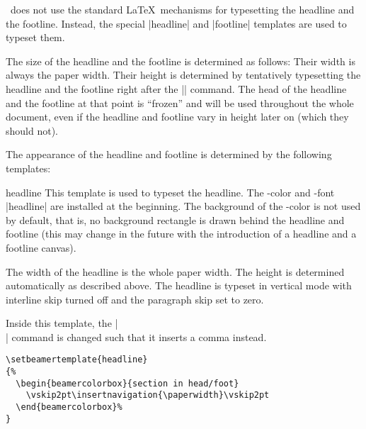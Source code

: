 \beamer\ does not use the standard \LaTeX\ mechanisms for typesetting the headline and the footline. Instead, the special |headline| and |footline| templates are used to typeset them.

The size of the headline and the footline is determined as follows: Their width is always the paper width. Their height is determined by tentatively typesetting the headline and the footline right after the || command. The head of the headline and the footline at that point is ``frozen'' and will be used throughout the whole document, even if the headline and footline vary in height later on (which they should not).

The appearance of the headline and footline is determined by the following templates:

\begin{element}{headline}\yes\yes\yes
  This template is used to typeset the headline. The \beamer-color and -font |headline| are installed at the beginning. The background of the \beamer-color is not used by default, that is, no background rectangle is drawn behind the headline and footline (this may change in the future with the introduction of a headline and a footline canvas).

  The width of the headline is the whole paper width. The height is determined automatically as described above. The headline is typeset in vertical mode with interline skip turned off and the paragraph skip set to zero.

  Inside this template, the |\\| command is changed such that it inserts a comma instead.

  \example
\begin{verbatim}
\setbeamertemplate{headline}
{%
  \begin{beamercolorbox}{section in head/foot}
    \vskip2pt\insertnavigation{\paperwidth}\vskip2pt
  \end{beamercolorbox}%
}
\end{verbatim}


\end{element}
